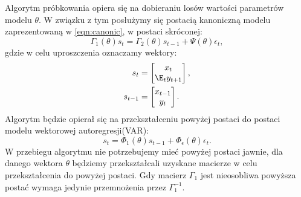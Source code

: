 
Algorytm próbkowania opiera się na dobieraniu losów wartości parametrów modelu $\theta$. W związku z tym posłużymy się postacią kanoniczną modelu zaprezentowaną w \eqref{eqn:canonic}, w postaci skróconej:
\begin{equation}
    \label{eqn:bayes_canonic}
    \Gamma_1(\theta) s_t = \Gamma_2(\theta) s_{t-1} + \Psi(\theta) \epsilon_t,
\end{equation}
gdzie w celu uproszczenia oznaczamy wektory:
\begin{align}
    s_t &= \begin{bmatrix}x_{t} \\ \E_t y_{t+1}\end{bmatrix}, \\
    s_{t-1} &= \begin{bmatrix}x_{t-1} \\ y_{t}\end{bmatrix}. \
\end{align}
Algorytm będzie opierał się na przekształceniu powyżej postaci do postaci modelu wektorowej autoregresji(VAR):
\begin{equation}
\label{eqn:varModel}
    s_t = \Phi_1(\theta)s_{t-1}+\Phi_{\epsilon}(\theta)\epsilon_t.
\end{equation}
W przebiegu algorytmu nie potrzebujemy mieć powyżej postaci jawnie, dla danego wektora $\theta$ będziemy przekształcali uzyskane macierze w celu przekształcenia do powyżej postaci. Gdy macierz $\Gamma_1$ jest nieosobliwa powyższa postać wymaga jedynie przemnożenia przez $\Gamma_1^{-1}$. 

